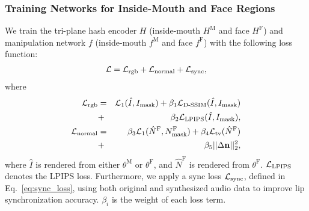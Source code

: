 \subsubsection{Training Networks for Inside-Mouth and Face Regions}
\label{sec:training network}
We train the tri-plane hash encoder $H$ (inside-mouth $H^\text{M}$ and face $H^\text{F}$) and manipulation network $f$ (inside-mouth $f^\text{M}$ and face $f^\text{F}$) with the following loss function:
\begin{eqnarray}
    \mathcal{L} = \mathcal{L}_\text{rgb} + \mathcal{L}_\text{normal} + \mathcal{L}_\text{sync},
\end{eqnarray}
where
\begin{eqnarray}
    \mathcal{L}_\text{rgb} &=& \mathcal{L}_1 (\hat{I}, I_\text{mask}) + \beta_1 \mathcal{L}_\text{D-SSIM} (\hat{I}, I_\text{mask}) \nonumber \\
    &+& \beta_2 \mathcal{L}_\text{LPIPS}(\hat{I}, I_\text{mask}), \\
    \mathcal{L}_\text{normal} &=& \beta_3 \mathcal{L}_1 (\hat{N}^\text{F}, N^\text{F}_\text{mask}) + \beta_4 \mathcal{L}_\text{tv}(\hat{N}^\text{F}) \nonumber\\ 
    &+& \beta_5 || \Delta \mathbf{n} ||^2_2,
\end{eqnarray}
where $\hat{I}$ is rendered from either $\theta^\text{M}$ or $\theta^\text{F}$, and $\hat{N}^\text{F}$ is rendered from $\theta^\text{F}$. $\mathcal{L}_\text{LPIPS}$ denotes the LPIPS loss. Furthermore, we apply a sync loss $\mathcal{L}_\text{sync}$, defined in Eq.~\ref{eq:sync_loss}, using both original and synthesized audio data to improve lip synchronization accuracy. $\beta_i$ is the weight of each loss term.



